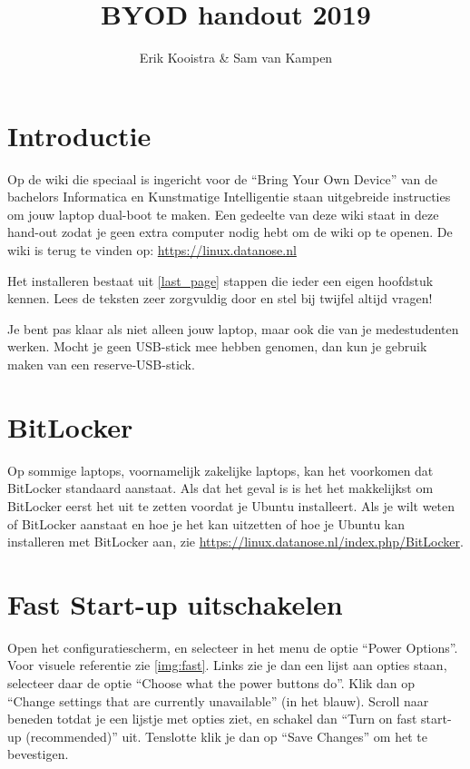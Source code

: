\documentclass[10pt,a4paper]{article}
\title{BYOD handout 2019}
\author{Erik Kooistra \& Sam van Kampen}
\begin{document}
\maketitle

\tableofcontents

\section{Introductie}

Op de wiki die speciaal is ingericht voor de ``Bring Your Own Device''
van de bachelors Informatica en Kunstmatige Intelligentie staan uitgebreide instructies
om jouw laptop dual-boot te maken. Een gedeelte van deze wiki staat in deze hand-out zodat
je geen extra computer nodig hebt om de wiki op te openen.
De wiki is terug te vinden op: \url{https://linux.datanose.nl}

Het installeren bestaat uit \ref*{last_page}  stappen die ieder een eigen hoofdstuk kennen.
Lees de teksten zeer zorgvuldig door en stel bij twijfel altijd vragen!

Je bent pas klaar als niet alleen jouw laptop, maar ook die van je medestudenten werken.
Mocht je geen USB-stick mee hebben genomen, dan kun je gebruik maken van een reserve-USB-stick.

\section{BitLocker}

Op sommige laptops, voornamelijk zakelijke laptops, kan het voorkomen dat BitLocker standaard
aanstaat. Als dat het geval is is het het makkelijkst om BitLocker eerst het uit te zetten voordat
je Ubuntu installeert. Als je wilt weten of BitLocker aanstaat en hoe je het kan uitzetten
of hoe je Ubuntu kan installeren met BitLocker aan, zie \url{https://linux.datanose.nl/index.php/BitLocker}.


\section{Fast Start-up uitschakelen}

Open het configuratiescherm, en selecteer in het menu de optie ``Power Options''. Voor visuele referentie zie \ref{img:fast}.
Links zie je dan een lijst aan opties staan,
selecteer daar de optie ``Choose what the power buttons do''.
Klik dan op ``Change settings that are currently unavailable'' (in het blauw).
Scroll naar beneden totdat je een lijstje met opties ziet,
en schakel dan ``Turn on fast start-up (recommended)'' uit.
Tenslotte klik je dan op ``Save Changes'' om het te bevestigen.
\end{document}
